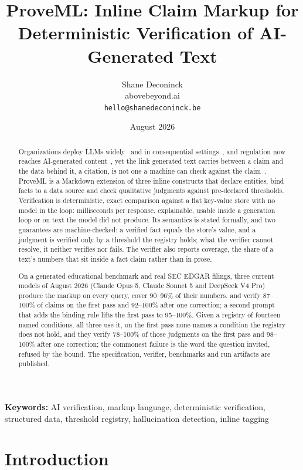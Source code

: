 \documentclass[11pt,a4paper]{article}
\title{\textbf{ProveML: Inline Claim Markup for Deterministic Verification of AI-Generated Text}}
\author{Shane Deconinck\\\small{abovebeyond.ai}\\\small{\texttt{hello@shanedeconinck.be}}}
\date{August 2026}
\begin{document}
\maketitle

\begin{abstract}
Organizations deploy LLMs widely~\citep{aiindex2026} and in consequential settings~\citep{magesh2025}, and regulation now reaches AI-generated content~\citep{euaiact,art50guidelines2026}, yet the link generated text carries between a claim and the data behind it, a citation, is not one a machine can check against the claim~\citep{citednotverified,rao2026}. ProveML is a Markdown extension of three inline constructs that declare entities, bind facts to a data source and check qualitative judgments against pre-declared thresholds. Verification is deterministic, exact comparison against a flat key-value store with no model in the loop: milliseconds per response, explainable, usable inside a generation loop or on text the model did not produce. Its semantics is stated formally, and two guarantees are machine-checked: a verified fact equals the store's value, and a judgment is verified only by a threshold the registry holds; what the verifier cannot resolve, it neither verifies nor fails. The verifier also reports coverage, the share of a text's numbers that sit inside a fact claim rather than in prose.

On a generated educational benchmark and real SEC EDGAR filings, three current models of August 2026 (Claude Opus 5, Claude Sonnet 5 and DeepSeek V4 Pro) produce the markup on every query, cover 90--96\% of their numbers, and verify 87--100\% of claims on the first pass and 92--100\% after one correction; a second prompt that adds the binding rule lifts the first pass to 95--100\%. Given a registry of fourteen named conditions, all three use it, on the first pass none names a condition the registry does not hold, and they verify 78--100\% of those judgments on the first pass and 98--100\% after one correction; the commonest failure is the word the question invited, refused by the bound. The specification, verifier, benchmarks and run artifacts are published.
\end{abstract}

\noindent\textbf{Keywords:} AI verification, markup language, deterministic verification, structured data, threshold registry, hallucination detection, inline tagging


\section{Introduction}
\end{document}
